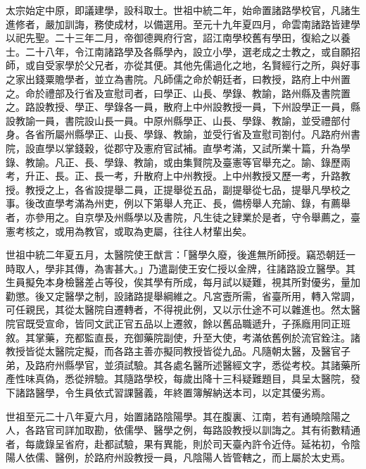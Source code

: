 \begin{pinyinscope}
 太宗始定中原，即議建學，設科取士。世祖中統二年，始命置諸路學校官，凡諸生進修者，嚴加訓誨，務使成材，以備選用。至元十九年夏四月，命雲南諸路皆建學以祀先聖。二十三年二月，帝御德興府行宮，詔江南學校舊有學田，復給之以養士。二十八年，令江南諸路學及各縣學內，設立小學，選老成之士教之，或自願招師，或自受家學於父兄者，亦從其便。其他先儒過化之地，名賢經行之所，與好事之家出錢粟贍學者，並立為書院。凡師儒之命於朝廷者，曰教授，路府上中州置之。命於禮部及行省及宣慰司者，曰學正、山長、學錄、教諭，路州縣及書院置之。路設教授、學正、學錄各一員，散府上中州設教授一員，下州設學正一員，縣設教諭一員，書院設山長一員。中原州縣學正、山長、學錄、教諭，並受禮部付身。各省所屬州縣學正、山長、學錄、教諭，並受行省及宣慰司劄付。凡路府州書院，設直學以掌錢穀，從郡守及憲府官試補。直學考滿，又試所業十篇，升為學錄、教諭。凡正、長、學錄、教諭，或由集賢院及臺憲等官舉充之。諭、錄歷兩考，升正、長。正、長一考，升散府上中州教授。上中州教授又歷一考，升路教授。教授之上，各省設提舉二員，正提舉從五品，副提舉從七品，提舉凡學校之事。後改直學考滿為州吏，例以下第舉人充正、長，備榜舉人充諭、錄，有薦舉者，亦參用之。自京學及州縣學以及書院，凡生徒之肄業於是者，守令舉薦之，臺憲考核之，或用為教官，或取為吏屬，往往人材輩出矣。



 世祖中統二年夏五月，太醫院使王猷言：「醫學久廢，後進無所師授。竊恐朝廷一時取人，學非其傳，為害甚大。」乃遣副使王安仁授以金牌，往諸路設立醫學。其生員擬免本身檢醫差占等役，俟其學有所成，每月試以疑難，視其所對優劣，量加勸懲。後又定醫學之制，設諸路提舉綱維之。凡宮壼所需，省臺所用，轉入常調，可任親民，其從太醫院自遷轉者，不得視此例，又以示仕途不可以雜進也。然太醫院官既受宣命，皆同文武正官五品以上遷敘，餘以舊品職遞升，子孫廕用同正班敘。其掌藥，充都監直長，充御藥院副使，升至大使，考滿依舊例於流官銓注。諸教授皆從太醫院定擬，而各路主善亦擬同教授皆從九品。凡隨朝太醫，及醫官子弟，及路府州縣學官，並須試驗。其各處名醫所述醫經文字，悉從考校。其諸藥所產性味真偽，悉從辨驗。其隨路學校，每歲出降十三科疑難題目，具呈太醫院，發下諸路醫學，令生員依式習課醫義，年終置簿解納送本司，以定其優劣焉。



 世祖至元二十八年夏六月，始置諸路陰陽學。其在腹裏、江南，若有通曉陰陽之人，各路官司詳加取勘，依儒學、醫學之例，每路設教授以訓誨之。其有術數精通者，每歲錄呈省府，赴都試驗，果有異能，則於司天臺內許令近侍。延祐初，令陰陽人依儒、醫例，於路府州設教授一員，凡陰陽人皆管轄之，而上屬於太史焉。




\end{pinyinscope}

